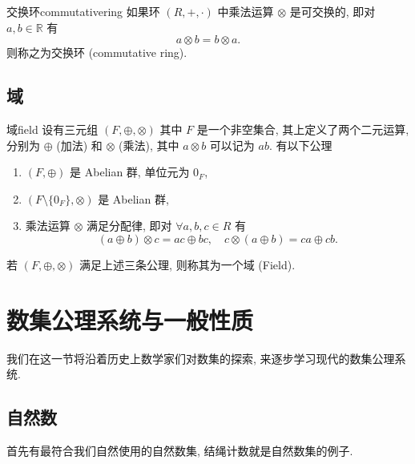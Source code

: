 \documentclass[cn,toc=twocol]{elegantbook}
\newcommand{\ITEMS}{\begin{enumerate}}
\newcommand{\ITEME}{\end{enumerate}}
\newcommand{\R}{\mathbb{R}}
\begin{document}
\begin{definition}{交换环}{commutativering}
	如果环 $(R,+,\cdot)$ 中乘法运算 $\otimes$ 是可交换的, 即对 $a,b \in \R$ 有
	\[
		a \otimes b = b \otimes a.
	\]
	则称之为交换环 (commutative ring).
\end{definition}

\subsection{域}

\begin{axiom}{域}{field}
	设有三元组 $(F,\oplus,\otimes)$ 其中 $F$ 是一个非空集合, 其上定义了两个二元运算, 分别为 $\oplus$ (加法) 和 $\otimes$ (乘法), 其中 $a \otimes b$ 可以记为 $ab$. 有以下公理
	\ITEMS
		\item[{\boldmath $F_1$}] $(F,\oplus)$ 是 Abelian 群, 单位元为 $0_F$,
		\item[{\boldmath $F_2$}] $(F\setminus\{0_F\},\otimes)$ 是 Abelian 群,
		\item[{\boldmath $F_3$}] 乘法运算 $\otimes$ 满足分配律, 即对 $\forall a,b,c \in R$ 有
		\[
			(a \oplus b) \otimes c = ac \oplus bc, \quad c \otimes(a\oplus b) = ca \oplus cb.
		\]
	\ITEME
	若 $(F,\oplus,\otimes)$ 满足上述三条公理, 则称其为一个域 (Field).

\end{axiom}





\section{数集公理系统与一般性质}

我们在这一节将沿着历史上数学家们对数集的探索, 来逐步学习现代的数集公理系统.

\subsection{自然数}

首先有最符合我们自然使用的自然数集, 结绳计数就是自然数集的例子.
\end{document}
